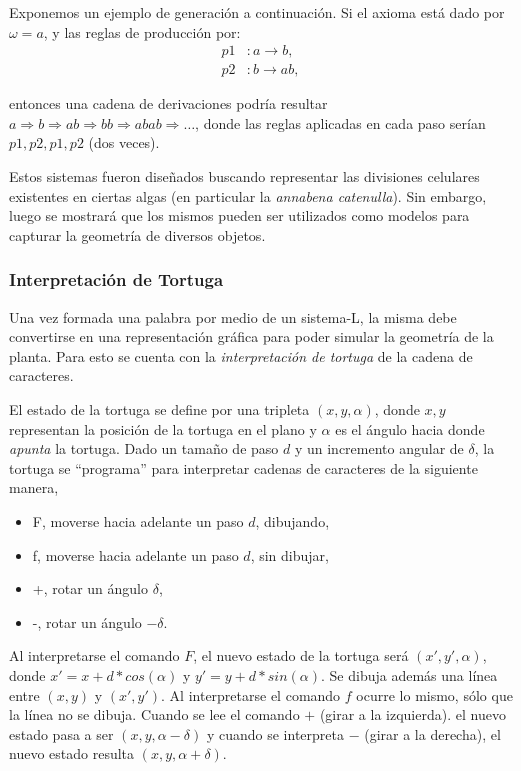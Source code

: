 Exponemos un ejemplo de generación a continuación.
Si el axioma está dado por $\omega = a$, y las reglas de producción por:
\begin{align*}
p1 &: a \rightarrow b,\\
p2 &: b \rightarrow ab,
\end{align*}

\noindent entonces una cadena de derivaciones podría resultar $a \Rightarrow b \Rightarrow ab \Rightarrow bb \Rightarrow abab \Rightarrow \dots$, donde las reglas aplicadas en cada paso serían $p1, p2, p1, p2$ (dos veces).

Estos sistemas fueron diseñados buscando representar las divisiones celulares existentes en ciertas algas (en particular la {\it annabena catenulla}).
Sin embargo, luego se mostrará que los mismos pueden ser utilizados como modelos para capturar la geometría de diversos objetos.

\subsubsection{Interpretación de Tortuga}
Una vez formada una palabra por medio de un sistema-L, la misma debe convertirse en una representación gráfica para poder simular la geometría de la planta.
Para esto se cuenta con la {\em interpretación de tortuga} de la cadena de caracteres.

El estado de la tortuga se define por una tripleta $(x,y,\alpha)$, donde $x,y$ representan la posición de la tortuga en el plano y $\alpha$ es el ángulo hacia donde {\em apunta} la tortuga.
Dado un tamaño de paso $d$ y un incremento angular de $\delta$, la tortuga se ``programa'' para interpretar cadenas de caracteres de la siguiente manera,

\begin{itemize}
\item F, moverse hacia adelante un paso $d$, dibujando,
\item f, moverse hacia adelante un paso $d$, sin dibujar,
\item +, rotar un ángulo $\delta$,
\item -, rotar un ángulo $-\delta$.
\end{itemize}

Al interpretarse el comando $F$, el nuevo estado de la tortuga será $(x',y',\alpha)$, donde $x' = x + d * cos(\alpha)$ y $y' = y + d * sin(\alpha)$. Se dibuja además una línea entre $(x,y)$ y $(x',y')$.
Al interpretarse el comando $f$ ocurre lo mismo, sólo que la línea no se dibuja.
Cuando se lee el comando $+$ (girar a la izquierda). el nuevo estado pasa a ser $(x,y,\alpha-\delta)$ y cuando se interpreta $-$ (girar a la derecha), el nuevo estado resulta $(x,y,\alpha+\delta)$.

